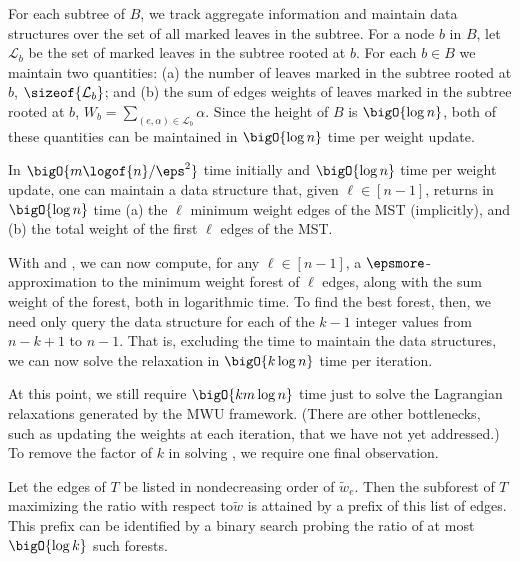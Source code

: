 \documentclass{toc}
\newcommand{\leavesof}[1]{\mathcal{L}_{#1}}
\newcommand{\apxweight}{\tilde{w}}%
\newcommand{\apxweightof}[1]{\apxweight_{#1}}%
\newcommand{\wrt}{with respect to\xspace} %
\begin{document}
For each subtree of $B$, we track aggregate information and maintain
data structures over the set of all marked leaves in the subtree. For
a node $b$ in $B$, let $\leavesof{b}$ be the set of marked leaves in the
subtree rooted at $b$. For each $b \in B$ we maintain two quantities:
(a) the number of leaves marked in the subtree rooted at $b$,
$\sizeof{\leavesof{b}}$; and (b) the sum of edges weights of leaves
marked in the subtree rooted at $b$,
$W_b = \sum_{(e,\alpha) \in \leavesof{b}} \alpha$. Since the height of
$B$ is $\bigO{\log n}$, both of these quantities can be maintained in
$\bigO{\log n}$ time per weight update.

\begin{lemma}
  In $\bigO{m \logof{n} / \eps^2}$ time initially and $\bigO{\log n}$
  time per weight update, one can maintain a data structure that,
  given $\ell \in [n-1]$, returns in $\bigO{\log n}$ time (a) the
  $\ell$ minimum weight edges of the MST (implicitly), and (b) the
  total weight of the first $\ell$ edges of the MST.
\end{lemma}

With  and , we can now
compute, for any $\ell \in [n-1]$, a $\epsmore$-approximation to the
minimum weight forest of $\ell$ edges, along with the sum weight of
the forest, both in logarithmic time. To find the best forest, then,
we need only query the data structure for each of the $k-1$ integer
values from $n - k + 1$ to $n - 1$. That is, excluding the time to
maintain the data structures, we can now solve the relaxation
 in $\bigO{k \log n}$ time per iteration.

At this point, we still require $\bigO{k m \log n}$ time just to solve
the Lagrangian relaxations  generated by the
MWU framework. (There are other bottlenecks, such as updating the
weights at each iteration, that we have not yet addressed.) To remove
the factor of $k$ in solving , we require one
final observation.

\begin{lemma}
   Let the edges of $T$ be listed in
  nondecreasing order of $\apxweightof{e}$. Then the subforest of $T$
  maximizing the ratio  \wrt $\apxweight$ is
  attained by a prefix of this list of edges. This prefix can be
  identified by a binary search probing the ratio of at most
  $\bigO{\log k}$ such forests.
\end{lemma}
\end{document}
